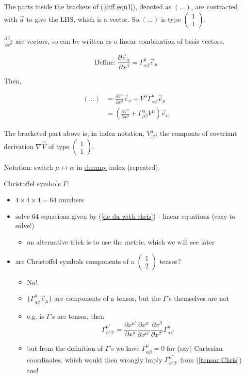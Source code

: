 \documentclass[a4paper]{article} %
\newcommand{\pmx}[1]{
\begin{pmatrix}
#1
\end{pmatrix}
}
\begin{document}
The parts inside the brackets of (\ref{diff eqn1}), denoted as $(\ldots)$, are contracted with $\vec{u}$ to give the LHS, which is a vector. So $(\ldots)$ is type $\pmx{1\\1}$.

$\frac{\partial \vec{e}_{\alpha}}{\partial x^{\beta}}$ are vectors, so can be written as a linear combination of basis vectors. 

\begin{equation}
\text{Define: } \frac{\partial \vec{e}_{\alpha}}{\partial x^{\beta}}=\Gamma^{\mu}_{\alpha\beta} \vec{e}_{\mu}\label{de dx with chris}
\end{equation}

Then,

\begin{align*}
(\ldots)&=\frac{\partial V^{\alpha}}{\partial x^{\beta}}\vec{e}_{\alpha} + V^{\alpha}\Gamma^{\mu}_{\alpha\beta}\vec{e}_{\mu}\\
&=\left(\frac{\partial V^{\alpha}}{\partial x^{\beta}}+\Gamma^{\alpha}_{\mu\beta}V^{\mu}\right)
\vec{e}_{\alpha}
\end{align*}

The bracketed part above is, in index notation, $V^{\alpha}_{; \beta}$; the componts of covariant derivation $\nabla \vec{V}$ of type $\pmx{1\\1}$.

Notation: switch $\mu \leftrightarrow \alpha$ in \underline{dummy} index (repeated).

Christoffel symbols $\Gamma$:
\begin{itemize}
\item $4\times 4\times 4=64$ numbers
\item solve 64 equations given by (\ref{de dx with chris}) - linear equations (easy to solve!)
\begin{itemize}
\item an alternative trick is to use the metric, which we will see later
\end{itemize}
\item are Christoffel symbols components of a $\pmx{1\\2}$ tensor?
\begin{itemize}
\item No!
\item $\{\Gamma^{\mu}_{\alpha\beta}\vec{e}_{\mu}\}$ are components of a tensor, but the $\Gamma$'s themselves are not
\item e.g. is $\Gamma$'s are tensor, then
\begin{equation}
\Gamma^{\mu'}_{\alpha' \beta'}=\frac{\partial x^{\mu'}}{\partial x^{\mu}}\frac{\partial x^{\alpha}}{\partial x^{\alpha'}}\frac{\partial x^{\beta}}{\partial x^{\beta'}}\Gamma^{\mu}_{\alpha\beta}\label{tensor Chris}
\end{equation}
\item but from the definition of $\Gamma$'s we have $\Gamma^{\mu}_{\alpha\beta}=0$ for (say) Cartesian coordinates, which would then wrongly imply $\Gamma^{\mu'}_{\alpha'\beta'}$ from (\ref{tensor Chris}) too!
\end{itemize}
\end{itemize}
\end{document}
